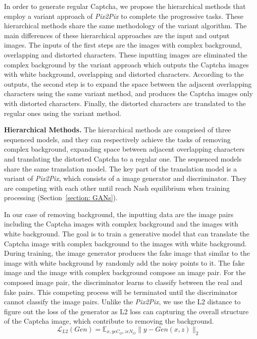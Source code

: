 In order to generate regular Captcha, we propose the hierarchical methods that employ a variant approach of \emph{Pix2Pix} to complete the progressive tasks.
These hierarchical methods share the same methodology of the variant algorithm.
The main differences of these hierarchical approaches are the input and output images. The inputs of the first steps are the images with complex background, overlapping and distorted characters.
These inputting images are eliminated the complex background by the variant approach which outputs the Captcha images with white background, overlapping and distorted characters.
According to the outputs, the second step is to expand the space between the adjacent overlapping characters using the same variant method, and produces the Captcha images only with distorted characters.
Finally, the distorted characters are translated to the regular ones using the variant method.

\noindent \textbf{Hierarchical Methods.} The hierarchical methods are comprised of three sequenced models, and they can respectively achieve the tasks of removing complex background, expanding space between adjacent overlapping characters and translating the distorted Captcha to a regular one. The sequenced models share the same translation model.
The key part of the translation model is a variant of \emph{Pix2Pix}, which consists of a image generator and discriminator. They are competing with each other until reach Nash equilibrium when training processing (Section~\ref{section: GANs}).

In our case of removing background, the inputting data are the image pairs including the Captcha images with complex background and the images with white background.
The goal is to train a generative model that can translate the Captcha image with complex background to the images with white background.
During training, the image generator produces the fake image that similar to the image with white background by randomly add the noisy points to it. The fake image and the image with complex background compose an image pair.
For the composed image pair, the discriminator learns to classify between the real and fake pairs. This competing process will be terminated until the discriminator cannot classify the image pairs.
Unlike the \emph{Pix2Pix}, we use the L2 distance to figure out the loss of the generator as L2 loss can capturing the overall structure of the Captcha image, which contribute to removing the background.
\begin{equation}\label{equation: L2_loss}
    \mathcal{L}_{L2}(Gen) = \mathbb{E}_{x,y \epsilon C_{O}, z \epsilon N_{O}} \|y - Gen(x, z)\|_{2}
\end{equation}


